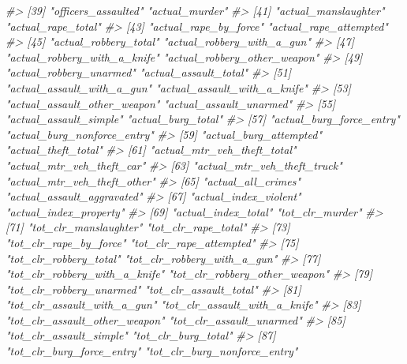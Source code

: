 \documentclass[
  12pt,
]{book}
\newenvironment{Shaded}{\begin{snugshade}}{\end{snugshade}}
\newcommand{\CommentTok}[1]{\textcolor[rgb]{0.37,0.37,0.37}{\textit{#1}}}
\begin{document}
\begin{Shaded}
\begin{Highlighting}[]
\CommentTok{\#\textgreater{}  [39] "officers\_assaulted"             "actual\_murder"                 }
\CommentTok{\#\textgreater{}  [41] "actual\_manslaughter"            "actual\_rape\_total"             }
\CommentTok{\#\textgreater{}  [43] "actual\_rape\_by\_force"           "actual\_rape\_attempted"         }
\CommentTok{\#\textgreater{}  [45] "actual\_robbery\_total"           "actual\_robbery\_with\_a\_gun"     }
\CommentTok{\#\textgreater{}  [47] "actual\_robbery\_with\_a\_knife"    "actual\_robbery\_other\_weapon"   }
\CommentTok{\#\textgreater{}  [49] "actual\_robbery\_unarmed"         "actual\_assault\_total"          }
\CommentTok{\#\textgreater{}  [51] "actual\_assault\_with\_a\_gun"      "actual\_assault\_with\_a\_knife"   }
\CommentTok{\#\textgreater{}  [53] "actual\_assault\_other\_weapon"    "actual\_assault\_unarmed"        }
\CommentTok{\#\textgreater{}  [55] "actual\_assault\_simple"          "actual\_burg\_total"             }
\CommentTok{\#\textgreater{}  [57] "actual\_burg\_force\_entry"        "actual\_burg\_nonforce\_entry"    }
\CommentTok{\#\textgreater{}  [59] "actual\_burg\_attempted"          "actual\_theft\_total"            }
\CommentTok{\#\textgreater{}  [61] "actual\_mtr\_veh\_theft\_total"     "actual\_mtr\_veh\_theft\_car"      }
\CommentTok{\#\textgreater{}  [63] "actual\_mtr\_veh\_theft\_truck"     "actual\_mtr\_veh\_theft\_other"    }
\CommentTok{\#\textgreater{}  [65] "actual\_all\_crimes"              "actual\_assault\_aggravated"     }
\CommentTok{\#\textgreater{}  [67] "actual\_index\_violent"           "actual\_index\_property"         }
\CommentTok{\#\textgreater{}  [69] "actual\_index\_total"             "tot\_clr\_murder"                }
\CommentTok{\#\textgreater{}  [71] "tot\_clr\_manslaughter"           "tot\_clr\_rape\_total"            }
\CommentTok{\#\textgreater{}  [73] "tot\_clr\_rape\_by\_force"          "tot\_clr\_rape\_attempted"        }
\CommentTok{\#\textgreater{}  [75] "tot\_clr\_robbery\_total"          "tot\_clr\_robbery\_with\_a\_gun"    }
\CommentTok{\#\textgreater{}  [77] "tot\_clr\_robbery\_with\_a\_knife"   "tot\_clr\_robbery\_other\_weapon"  }
\CommentTok{\#\textgreater{}  [79] "tot\_clr\_robbery\_unarmed"        "tot\_clr\_assault\_total"         }
\CommentTok{\#\textgreater{}  [81] "tot\_clr\_assault\_with\_a\_gun"     "tot\_clr\_assault\_with\_a\_knife"  }
\CommentTok{\#\textgreater{}  [83] "tot\_clr\_assault\_other\_weapon"   "tot\_clr\_assault\_unarmed"       }
\CommentTok{\#\textgreater{}  [85] "tot\_clr\_assault\_simple"         "tot\_clr\_burg\_total"            }
\CommentTok{\#\textgreater{}  [87] "tot\_clr\_burg\_force\_entry"       "tot\_clr\_burg\_nonforce\_entry"   }

\end{Highlighting}
\end{Shaded}
\end{document}
